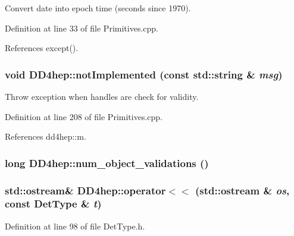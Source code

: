 Convert date into epoch time (seconds since 1970). 

Definition at line 33 of file Primitives.cpp.

References except().\hypertarget{namespace_d_d4hep_a2567960a4486c9f442089e0893b84d27}{
\subsubsection[{notImplemented}]{\setlength{\rightskip}{0pt plus 5cm}void DD4hep::notImplemented (const std::string \& {\em msg})}}
\label{namespace_d_d4hep_a2567960a4486c9f442089e0893b84d27}


Throw exception when handles are check for validity. 

Definition at line 208 of file Primitives.cpp.

References dd4hep::m.\hypertarget{namespace_d_d4hep_a022862a49c9bd20d654f90dbcb88c14f}{
\subsubsection[{num\_\-object\_\-validations}]{\setlength{\rightskip}{0pt plus 5cm}long DD4hep::num\_\-object\_\-validations ()}}
\label{namespace_d_d4hep_a022862a49c9bd20d654f90dbcb88c14f}
\hypertarget{namespace_d_d4hep_aca377a4dd449424cf1da9d44dda78433}{
\subsubsection[{operator$<$$<$}]{\setlength{\rightskip}{0pt plus 5cm}std::ostream\& DD4hep::operator$<$$<$ (std::ostream \& {\em os}, \/  const DetType \& {\em t})}}
\label{namespace_d_d4hep_aca377a4dd449424cf1da9d44dda78433}


Definition at line 98 of file DetType.h.

